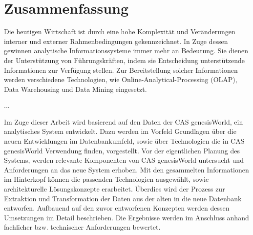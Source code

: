 
\chapter*{\centering Zusammenfassung}

Die heutigen Wirtschaft ist durch eine hohe Komplexität und Veränderungen interner und externer Rahmenbedingungen gekennzeichnet. In Zuge dessen gewinnen analytische Informationssysteme immer mehr an Bedeutung. Sie dienen der Unterstützung von Führungskräften, indem sie Entscheidung unterstützende Informationen zur Verfügung stellen. Zur Bereitstellung solcher Informationen werden verschiedene Technologien, wie Online-Analytical-Processing (OLAP), Data Warehousing und Data Mining eingesetzt.

... 

Im Zuge dieser Arbeit wird basierend auf den Daten der CAS genesisWorld, ein analytisches System entwickelt. Dazu werden im Vorfeld Grundlagen über die neuen Entwicklungen im Datenbankumfeld, sowie über Technologien die in CAS genesisWorld Verwendung finden, vorgestellt. Vor der eigentlichen Planung des Systems, werden relevante Komponenten von CAS genesisWorld untersucht und Anforderungen an das neue System erhoben. Mit den gesammelten Informationen im Hinterkopf können die passenden Technologien ausgewählt, sowie architekturelle Lösungskonzepte erarbeitet. Überdies wird der Prozess zur Extraktion und Transformation der Daten aus der alten in die neue Datenbank entworfen. Aufbauend auf den zuvor entworfenen Konzepten werden dessen Umsetzungen im Detail beschrieben. Die Ergebnisse werden im Anschluss anhand fachlicher bzw. technischer Anforderungen bewertet.